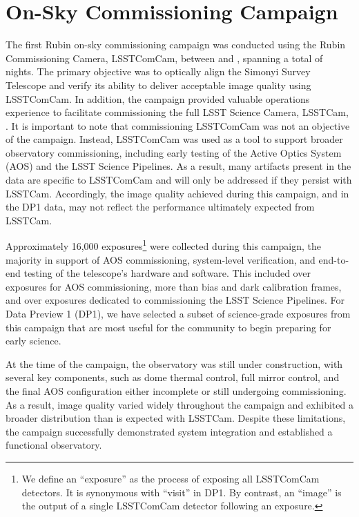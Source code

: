 \section{On-Sky Commissioning Campaign \label{sec:on_sky_campaign}}

The first Rubin on-sky commissioning campaign was conducted using the Rubin Commissioning Camera, LSSTComCam, between \campaignstartdate and \dponeenddate, spanning a total of \nnightscomcam nights.
The primary objective was to optically align the Simonyi Survey Telescope and verify its ability to deliver acceptable image quality using LSSTComCam. 
In addition, the campaign provided valuable operations experience to facilitate commissioning the full LSST Science Camera, LSSTCam, \citep{2024SPIE13096E..1SR,2024SPIE13096E..1OL}.
It is important to note that commissioning LSSTComCam  was not an objective of the campaign.
Instead, LSSTComCam was used as a tool to support broader observatory commissioning, including early testing of the Active Optics System (AOS) and the LSST Science Pipelines. 
As a result, 
many artifacts present in the data are specific to LSSTComCam and will only be addressed if they persist with LSSTCam.
Accordingly, the image quality achieved during this campaign, and in the DP1 data, may not reflect the performance ultimately expected from LSSTCam.

Approximately 16,000 exposures\footnote{We define an ``exposure'' as the process of exposing all LSSTComCam detectors. It is synonymous with ``visit'' in DP1. By contrast, an ``image'' is the output of a single LSSTComCam detector following an exposure.} were collected during this campaign, the majority in support of AOS commissioning, system-level verification, and end-to-end testing of the telescope’s hardware and software.
This included over \nexposuresaoscommissioning exposures for AOS commissioning, more than \nexposurescalibcommissioning bias and dark calibration frames, and over \nexposuresspcommissioning exposures dedicated to commissioning the LSST Science Pipelines. 
For Data Preview 1 (DP1), we have selected a subset of \nexposures science-grade exposures from this campaign that are most useful for the community to begin preparing for early science.

At the time of the campaign, the observatory was still under construction, with several key components, such as dome thermal control, full mirror control, and the final AOS configuration either incomplete or still undergoing commissioning. 
As a result, image quality varied widely throughout the campaign and exhibited a broader distribution than is expected with LSSTCam. 
Despite these limitations, the campaign successfully demonstrated system integration and established a functional observatory. 

